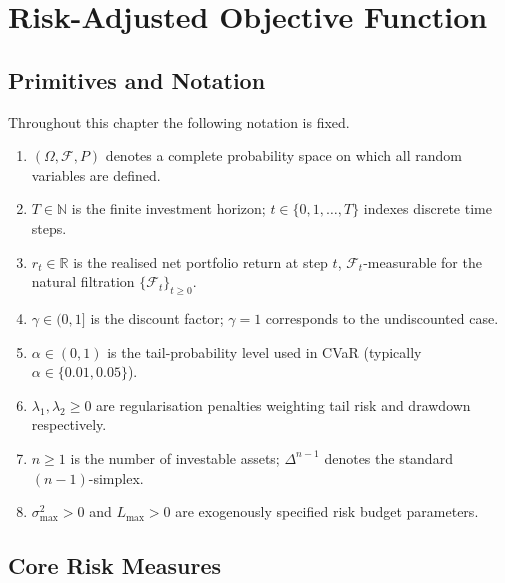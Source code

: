 \documentclass[12pt,openany]{book}
\numberwithin{equation}{chapter}
\theoremstyle{plain}
\theoremstyle{definition}
\theoremstyle{remark}
\numberwithin{equation}{chapter}
\theoremstyle{plain}
\begin{document}
\chapter{Risk-Adjusted Objective Function}
\label{ch:objective}

\section{Primitives and Notation}
\label{sec:obj-notation}

\noindent
Throughout this chapter the following notation is fixed.

\begin{enumerate}
  \item $(\Omega, \mathcal{F}, P)$ denotes a complete probability space
        on which all random variables are defined.
  \item $T \in \mathbb{N}$ is the finite investment horizon;
        $t \in \{0, 1, \ldots, T\}$ indexes discrete time steps.
  \item $r_t \in \mathbb{R}$ is the realised net portfolio return at
        step $t$, $\mathcal{F}_t$-measurable for the natural filtration
        $\{\mathcal{F}_t\}_{t \geq 0}$.
  \item $\gamma \in (0, 1]$ is the discount factor;
        $\gamma = 1$ corresponds to the undiscounted case.
  \item $\alpha \in (0, 1)$ is the tail-probability level used in CVaR
        (typically $\alpha \in \{0.01, 0.05\}$).
  \item $\lambda_1, \lambda_2 \geq 0$ are regularisation penalties
        weighting tail risk and drawdown respectively.
  \item $n \geq 1$ is the number of investable assets;
        $\Delta^{n-1}$ denotes the standard $(n-1)$-simplex.
  \item $\sigma_{\max}^2 > 0$ and $L_{\max} > 0$ are exogenously
        specified risk budget parameters.
\end{enumerate}

\section{Core Risk Measures}
\label{sec:obj-risk}
\end{document}

